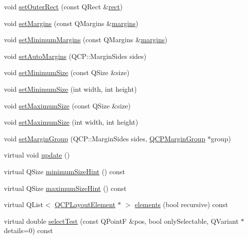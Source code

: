\begin{DoxyCompactItemize}
\item 
void \hyperlink{class_q_c_p_layout_element_a38975ea13e36de8e53391ce41d94bc0f}{set\-Outer\-Rect} (const Q\-Rect \&\hyperlink{class_q_c_p_layout_element_affdfea003469aac3d0fac5f4e06171bc}{rect})
\item 
void \hyperlink{class_q_c_p_layout_element_a8f450b1f3f992ad576fce2c63d8b79cf}{set\-Margins} (const Q\-Margins \&\hyperlink{class_q_c_p_layout_element_a85ff977dfcced84eef32d9f819ec9543}{margins})
\item 
void \hyperlink{class_q_c_p_layout_element_a0a8a17abc16b7923159fcc7608f94673}{set\-Minimum\-Margins} (const Q\-Margins \&\hyperlink{class_q_c_p_layout_element_a85ff977dfcced84eef32d9f819ec9543}{margins})
\item 
void \hyperlink{class_q_c_p_layout_element_accfda49994e3e6d51ed14504abf9d27d}{set\-Auto\-Margins} (Q\-C\-P\-::\-Margin\-Sides sides)
\item 
void \hyperlink{class_q_c_p_layout_element_a5dd29a3c8bc88440c97c06b67be7886b}{set\-Minimum\-Size} (const Q\-Size \&size)
\item 
void \hyperlink{class_q_c_p_layout_element_a8e0447614a0bf92de9a7304588c6b96e}{set\-Minimum\-Size} (int width, int height)
\item 
void \hyperlink{class_q_c_p_layout_element_a74eb5280a737ab44833d506db65efd95}{set\-Maximum\-Size} (const Q\-Size \&size)
\item 
void \hyperlink{class_q_c_p_layout_element_a03e0e9c48f230217c529b0819f832d84}{set\-Maximum\-Size} (int width, int height)
\item 
void \hyperlink{class_q_c_p_layout_element_a516e56f76b6bc100e8e71d329866847d}{set\-Margin\-Group} (Q\-C\-P\-::\-Margin\-Sides sides, \hyperlink{class_q_c_p_margin_group}{Q\-C\-P\-Margin\-Group} $\ast$group)
\item 
virtual void \hyperlink{class_q_c_p_layout_element_a46d52cb1f07ba05564920321f4ada184}{update} ()
\item 
virtual Q\-Size \hyperlink{class_q_c_p_layout_element_aebe14fb71f858c0f98caf8d342a9864a}{minimum\-Size\-Hint} () const 
\item 
virtual Q\-Size \hyperlink{class_q_c_p_layout_element_adbd3a00fec44c977150c6be7329eb801}{maximum\-Size\-Hint} () const 
\item 
virtual Q\-List$<$ \hyperlink{class_q_c_p_layout_element}{Q\-C\-P\-Layout\-Element} $\ast$ $>$ \hyperlink{class_q_c_p_layout_element_a311d60d78e62ef8eaaedb1b6ceb9e788}{elements} (bool recursive) const 
\item 
virtual double \hyperlink{class_q_c_p_layout_element_a9fcf5d0ea19f2c23b2b528bce2c6f095}{select\-Test} (const Q\-Point\-F \&pos, bool only\-Selectable, Q\-Variant $\ast$details=0) const 
\end{DoxyCompactItemize}
